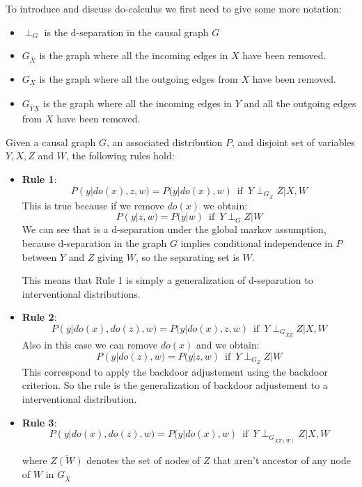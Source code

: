 To introduce and discuss do-calculus we first need to give some more notation:
\begin{itemize}
    \item $\perp_G$ is the d-separation in the causal graph $G$
    \item $G_{\overline{X}}$ is the graph where all the incoming edges in $X$ have been removed.
    \item $G_{\underline{X}}$ is the graph where all the outgoing edges from $X$ have been removed.
    \item $G_{\overline{Y}\underline{X}}$ is the graph where all the incoming edges in $Y$ and all the outgoing edges from $X$ have been removed. 
\end{itemize}
\begin{definition}
    Given a causal graph $G$, an associated distribution $P$, and disjoint set of variables $Y, X, Z$ and $W$, the following rules hold:
    \begin{itemize}
        \item \textbf{Rule 1}:
            \begin{equation}
                P(y | do(x), z, w) = P(y | do(x), w) \, \text{ if } \, Y \perp_{G_{\overline{X}}} Z | X, W
            \end{equation}
            This is true because if we remove $do(x)$ we obtain:
            $$P(y |z, w) = P(y | w) \, \text{ if } \, Y \perp_{G} Z | W$$
            We can see that is a d-separation under the global markov assumption, 
            because d-separation in the graph $G$ implies conditional independence 
            in $P$ between $Y$ and $Z$ giving $W$, so the separating set is $W$. 
            
            This means that Rule 1 is simply a generalization of d-separation to
            interventional distributions.
        \item \textbf{Rule 2}:
            \begin{equation}
                P(y | do(x), do(z), w) = P(y | do(x), z, w) \, \text{ if } \, Y \perp_{G_{\overline{X}\underline{Z}}} Z | X, W
            \end{equation}
            Also in this case we can remove $do(x)$ and we obtain:
            $$P(y | do(z), w) = P(y |  z, w) \, \text{ if } \, Y \perp_{G_{\underline{Z}}} Z | W$$
            This correspond to apply the backdoor adjustement using the backdoor 
            criterion. So the rule is the generalization of backdoor adjustement to 
            a interventional distribution.
        \item \textbf{Rule 3}:
            \begin{equation}
                P(y | do(x), do(z), w) = P(y | do(x), w) \, \text{ if } \, Y \perp_{G_{\overline{X}\overline{Z(W)}}} Z | X, W
            \end{equation}

            where $\overline{Z(W)}$ denotes the set of nodes of $Z$ that aren't ancestor of any node of $W$ in $G_{\overline{X}}$
    \end{itemize}
\end{definition}

